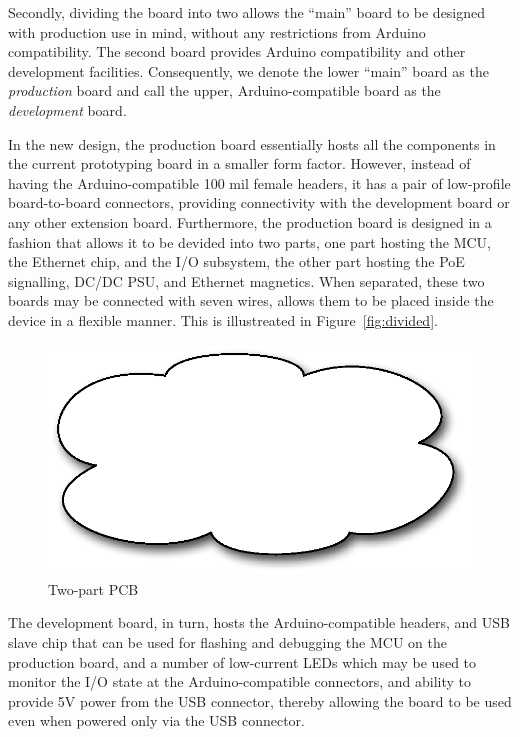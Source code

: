 \documentclass[final]{siamltex}
\begin{document}
Secondly, dividing the board into two allows the ``main'' board to be
designed with production use in mind, without any restrictions from
Arduino compatibility.  The second board provides Arduino
compatibility and other development facilities.  Consequently, we denote
the lower ``main'' board as the {\it production} board and call the
upper, Arduino-compatible board as the {\it development} board.

In the new design, the production board essentially hosts all the
components in the current prototyping board in a smaller form factor.
However, instead of having the Arduino-compatible 100 mil female
headers, it has a pair of low-profile board-to-board connectors,
providing connectivity with the development board or any other
extension board.  Furthermore, the production board is designed in a
fashion that allows it to be devided into two parts, one part hosting
the MCU, the Ethernet chip, and the I/O subsystem, the other part hosting the
PoE signalling, DC/DC PSU, and Ethernet magnetics.  When separated,
these two boards may be connected with seven wires, allows them to be
placed inside the device in a flexible manner.  This is illustreated
in Figure~\ref{fig:divided}.

\begin{figure}
\centering
\includegraphics[scale=.4]{figure-divided.eps}
\caption{Two-part PCB}
\label{fig:stacking}
\end{figure}

The development board, in turn, hosts the Arduino-compatible headers,
and USB slave chip that can be used for flashing and debugging the MCU
on the production board, and a number of low-current LEDs which may be
used to monitor the I/O state at the Arduino-compatible connectors, and ability
to provide 5V power from the USB connector, thereby allowing the board
to be used even when powered only via the USB connector.
\end{document}
